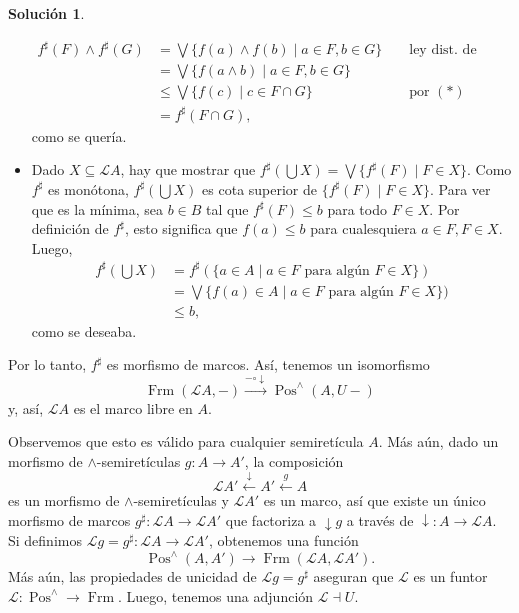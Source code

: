 \documentclass[12pt,letterpaper,titlepage]{article}
\theoremstyle{definition}
\newtheorem*{sol}{Solución}
\newcommand\Sup{\bigvee}
\newcommand\down{{\downarrow}}
\renewcommand\inf{\wedge}
\renewcommand\cal[1]{\mathcal{#1}}
\newcommand\rar[1]{\xrightarrow{#1}}
\newcommand\lar[1]{\xleftarrow{#1}}
\newcommand\<{\langle}
\renewcommand\>{\rangle}
\DeclareMathOperator{\Frm}{Frm}
\DeclareMathOperator{\Pos}{Pos}
\begin{document}
\begin{sol}
\begin{itemize}
\begin{align*}
            f^\sharp(F)\inf f^\sharp(G)
            &= \Sup\{f(a)\inf f(b) \mid a\in F, b\in G\}
                && \text{ ley dist. de marcos } \\
            &= \Sup\{f(a\inf b) \mid a\in F, b\in G\} \\
            &\leq \Sup\{f(c) \mid c\in F\cap G\}
                && \text{ por $(*)$ } \\
            &= f^\sharp(F\cap G),
        \end{align*}
        como se quería.
        \item
        Dado $X\subseteq \cal LA$, hay que mostrar que
        $f^\sharp(\bigcup X)=\Sup\{f^\sharp(F) \mid F\in X\}$.
        Como $f^\sharp$ es monótona,
        $f^\sharp(\bigcup X)$ es cota superior de
        $\{f^\sharp(F) \mid F\in X\}$.
        Para ver que es la mínima, sea $b\in B$ tal que
        $f^\sharp(F)\leq b$ para todo $F\in X$.
        Por definición de $f^\sharp$, esto significa que
        $f(a)\leq b$ para cualesquiera $a\in F, F\in X$.
        Luego,
        \begin{align*}
            f^\sharp(\bigcup X)
            &= f^\sharp (
            \{a\in A \mid a\in F\text{ para algún }F\in X\}
            ) \\
            &=
            \Sup\{f(a)\in A \mid a\in F\text{ para algún }F\in X\}) \\
            &\leq b,
        \end{align*}
        como se deseaba.
    \end{itemize}
    Por lo tanto, $f^\sharp$ es morfismo de marcos.
    Así, tenemos un isomorfismo
    \[
        \Frm(\cal LA,-)\rar{-\circ \down} \Pos^\inf(A,U-)
    \]
    y, así, $\cal LA$ es el marco libre en $A$.
    
    Observemos que esto es válido para cualquier
    semiretícula $A$.
    Más aún, dado un morfismo de $\inf$-semiretículas
    $g:A\to A'$, la composición
    \[
        \cal LA' \lar \down A' \lar g A
    \]
    es un morfismo de $\inf$-semiretículas y
    $\cal LA'$ es un marco, así que
    existe un único morfismo de marcos
    $g^\sharp:\cal LA\to \cal LA'$ que factoriza a
    $\down g$ a través de $\down:A\to \cal LA$.
    Si definimos $\cal Lg=g^\sharp:\cal LA\to\cal LA'$,
    obtenemos una función
    \[
        \Pos^\inf(A,A') \to \Frm(\cal LA,\cal LA')
    .\]
    Más aún, las propiedades de unicidad de
    $\cal Lg=g^\sharp$ aseguran que $\cal L$ es un funtor
    $\cal L:\Pos^\inf\to\Frm$.
    Luego, tenemos una adjunción $\cal L\dashv U$.
\end{sol}
\end{document}

